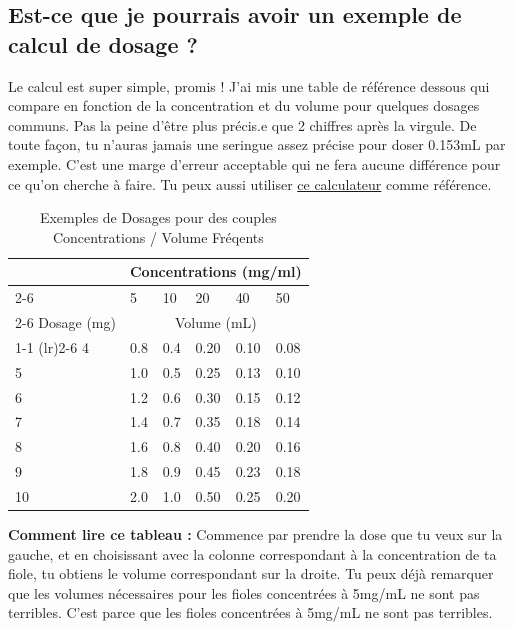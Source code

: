 \documentclass{article}
\begin{document}
\subsection{Est-ce que je pourrais avoir un exemple de calcul de dosage ?}

Le calcul est super simple, promis ! J'ai mis une table de référence dessous qui compare en fonction de la concentration et du volume pour quelques dosages communs. Pas la peine d'être plus précis.e que 2 chiffres après la virgule. De toute façon, tu n'auras jamais une seringue assez précise pour doser 0.153mL par exemple. C'est une marge d'erreur acceptable qui ne fera aucune différence pour ce qu'on cherche à faire. Tu peux aussi utiliser \href{https://hrtcafe.net/Calc/}{ce calculateur} comme référence.

\begin{table}[]
\centering
\caption{Exemples de Dosages pour des couples Concentrations / Volume Fréqents}
\label{tab:concentrations}
\begin{tabular}{@{}llllll@{}}
  \toprule
  \multicolumn{1}{c}{} & \multicolumn{5}{c}{Concentrations (mg/ml)} \\
  \cmidrule(rl){2-6}
            & 5    & 10  & 20 & 40 & 50   \\
            \cmidrule(rl){2-6}
Dosage (mg) & \multicolumn{5}{c}{Volume (mL)}  \\
    \cmidrule(r){1-1} \cmidrule(lr){2-6}
4        & 0.8  & 0.4 & 0.20  & 0.10 & 0.08\\
5        & 1.0    & 0.5 & 0.25 & 0.13 &  0.10\\
6        & 1.2  & 0.6   & 0.30  & 0.15 & 0.12   \\
7        & 1.4  & 0.7 & 0.35  & 0.18 & 0.14\\
8        & 1.6  & 0.8   & 0.40  & 0.20 & 0.16  \\
9        & 1.8  & 0.9 & 0.45  & 0.23 & 0.18\\
10       & 2.0    & 1.0   & 0.50  & 0.25 & 0.20 \\
    \bottomrule
\end{tabular}
\end{table}

\textbf{Comment lire ce tableau :} Commence par prendre la dose que tu veux sur la gauche, et en choisissant avec la colonne correspondant à la concentration de ta fiole, tu obtiens le volume correspondant sur la droite. Tu peux déjà remarquer que les volumes nécessaires pour les fioles concentrées à 5mg/mL ne sont pas terribles. C'est parce que les fioles concentrées à 5mg/mL ne sont pas terribles.
\end{document}
